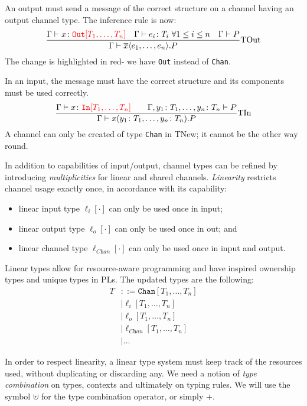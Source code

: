 \documentclass[a4paper, openany]{memoir}
\theoremstyle{definition}
\begin{document}
    An output must send a message of the correct structure on a channel having an output channel type. The inference rule is now:
    \[\frac{\Gamma \vdash x \colon {\color{red}\texttt{Out}[T_1, \dots, T_n]} \quad \Gamma \vdash e_i \colon T_i \ \forall 1 \leq i \leq n \quad \Gamma \vdash P}{\Gamma \vdash \overline{x} \langle e_1, \dots, e_n \rangle.P} \textrm{TOut}\]
    The change is highlighted in red- we have \texttt{Out} instead of \texttt{Chan}. 

    In an input, the message must have the correct structure and its components must be used correctly.
    \[\frac{\Gamma \vdash x \colon {\color{red}\texttt{In}[T_1, \dots, T_n]} \qquad \Gamma, y_1 \colon T_1, \dots, y_n \colon T_n \vdash P}{\Gamma \vdash x(y_1 \colon T_1, \dots, y_n \colon T_n).P} \textrm{TIn}\]
    A channel can only be created of type \texttt{Chan} in TNew; it cannot be the other way round.


    In addition to capabilities of input/output, channel types can be refined by introducing \emph{multiplicities} for linear and shared channels. \emph{Linearity} restricts channel usage exactly once, in accordance with its capability:
    \begin{itemize}
        \item linear input type $\ell_i[\cdot]$ can only be used once in input;
        \item linear output type $\ell_o[\cdot]$ can only be used once in out; and
        \item linear channel type $\ell_{\textit{Chan}}[\cdot]$ can only be used once in input and output.
    \end{itemize}
    Linear types allow for resource-aware programming and have inspired ownership types and unique types in PLs. The updated types are the following:
    \begin{align*}
        T &::= \texttt{Chan}[T_1, \dots, T_n] \\
        &\mid \ell_i[T_1, \dots, T_n] \\
        &\mid \ell_o[T_1, \dots, T_n] \\
        &\mid \ell_{\textit{Chan}}[T_1, \dots, T_n] \\
        &\mid \dots
    \end{align*}

    In order to respect linearity, a linear type system must keep track of the resources used, without duplicating or discarding any. We need a notion of \emph{type combination} on types, contexts and ultimately on typing rules. We will use the symbol $\uplus$ for the type combination operator, or simply $+$.
\end{document}
